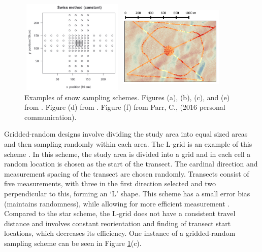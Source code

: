 \documentclass{sfuthesis}
\begin{document}
\begin{figure}
\begin{minipage}[c][11cm][t]{.33\textwidth}
\end{minipage}%
\begin{minipage}[c][11cm][t]{.33\textwidth}
        \vspace*{\fill}
  \centering
    \includegraphics[width=5cm,height=4.5cm]{swiss.png}
   \par\vfill
   \includegraphics[width=5cm,height=4.5cm]{hourglass.png}
\end{minipage}
\caption{Examples of snow sampling schemes. Figures (a), (b), (c), and (e) from \cite{Shea2010}. Figure (d) from \cite{Schweizer2008}. Figure (f) from Parr, C., (2016 personal communication).}
\label{schemes}
\end{figure}

Gridded-random designs involve dividing the study area into equal sized areas and then sampling randomly within each area. The L-grid is an example of this scheme \citep{Bellaire2008, Elder2009, Bellaire2011}. In this scheme, the study area is divided into a grid and in each cell a random location is chosen as the start of the transect. The cardinal direction and measurement spacing of the transect are chosen randomly. Transects consist of five measurements, with three in the first direction selected and two perpendicular to this, forming an `L' shape. This scheme has a small error bias (maintains randomness), while allowing for more efficient measurement \citep{Shea2010}. Compared to the star scheme, the L-grid does not have a consistent travel distance and involves constant reorientation and finding of transect start locations, which decreases its efficiency. One instance of a gridded-random sampling scheme can be seen in Figure \ref{schemes}(c). 
\end{document}
